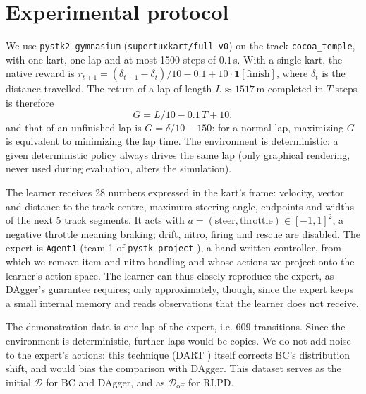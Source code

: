 \documentclass[10pt,a4paper,english]{article}
\newcommand{\D}{\mathcal{D}}
\newcommand{\ind}{\mathbf{1}}
\begin{document}
\section{Experimental protocol}
\label{sec-protocol}

We use \texttt{pystk2-gymnasium} \citep{pystk2gym} (\texttt{supertuxkart/full-v0}) on the track \texttt{cocoa\_temple}, with one kart, one lap and at most 1500 steps of $0.1$\,s. With a single kart, the native reward is $r_{t+1} = (\delta_{t+1} - \delta_t)/10 - 0.1 + 10 \cdot \ind[\text{finish}]$, where $\delta_t$ is the distance travelled. The return of a lap of length $L \approx 1517$\,m completed in $T$ steps is therefore
\begin{equation}
  G = L/10 - 0.1\,T + 10 ,
  \label{eq-return}
\end{equation}
and that of an unfinished lap is $G = \delta/10 - 150$: for a normal lap, maximizing $G$ is equivalent to minimizing the lap time. The environment is deterministic: a given deterministic policy always drives the same lap (only graphical rendering, never used during evaluation, alters the simulation).

The learner receives 28 numbers expressed in the kart's frame: velocity, vector and distance to the track centre, maximum steering angle, endpoints and widths of the next 5 track segments. It acts with $a = (\text{steer}, \text{throttle}) \in [-1,1]^2$, a negative throttle meaning braking; drift, nitro, firing and rescue are disabled. The expert is \texttt{Agent1} (team 1 of \texttt{pystk\_project} \citep{sigaud2025pystk}), a hand-written controller, from which we remove item and nitro handling and whose actions we project onto the learner's action space. The learner can thus closely reproduce the expert, as DAgger's guarantee requires; only approximately, though, since the expert keeps a small internal memory and reads observations that the learner does not receive.

The demonstration data is one lap of the expert, i.e. 609 transitions. Since the environment is deterministic, further laps would be copies. We do not add noise to the expert's actions: this technique (DART \citep{laskey2017dart}) itself corrects BC's distribution shift, and would bias the comparison with DAgger. This dataset serves as the initial $\D$ for BC and DAgger, and as $\D_{\text{off}}$ for RLPD.
\end{document}
